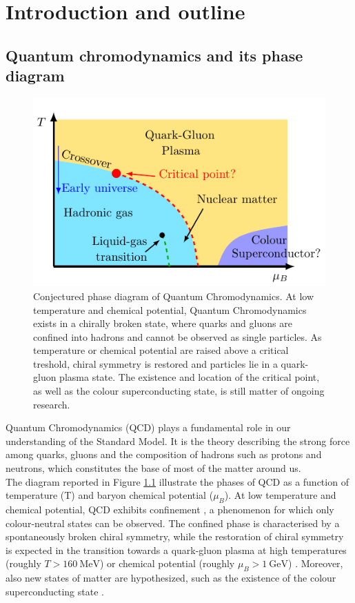 \chapter{Introduction and outline}
\label{chap:introduction}
\section{Quantum chromodynamics and its phase diagram}
\begin{figure}[h]
    \centering 
    \includegraphics[scale=1.3]{figures/phase_diagram.pdf}
    \caption[The phase diagram of QCD]{Conjectured phase diagram of Quantum Chromodynamics. At low temperature and chemical potential, Quantum Chromodynamics exists in a chirally broken state, where quarks and gluons are confined into hadrons and cannot be observed as single particles. As temperature or chemical potential are raised above a critical treshold, chiral symmetry is restored and particles lie in a quark-gluon plasma state. The existence and location of the critical point, as well as the colour superconducting state, is still matter of ongoing research.}
    \label{fig:QCD_phase_diagram}
\end{figure}
\noindent Quantum Chromodynamics (QCD) plays a fundamental role in our understanding of the Standard Model. It is the theory describing the strong force among quarks, gluons and the composition of hadrons such as protons and neutrons, which constitutes the base of most of the matter around us. \\
The diagram reported in Figure \ref{fig:QCD_phase_diagram} illustrate the phases of QCD as a function of temperature (T) and baryon chemical potential ($\mu_B$).
At low temperature and chemical potential, QCD exhibits confinement \cite{confinement_wilson,confin}, a phenomenon for which only colour-neutral states can be observed. The confined phase is characterised by a spontaneously broken chiral symmetry, while the restoration of chiral symmetry is expected in the transition towards a quark-gluon plasma at high temperatures (roughly $T > 160~\text{MeV}$) or chemical potential (roughly $\mu_B > 1~\text{GeV}$) \cite{Masayuki1989,Stephanov_1998,Berges_1999,doi:10.1142/S0217751X92001757,Endroedi_2014}. Moreover, also new states of matter are hypothesized, such as the existence of the colour superconducting state \cite{colorsuper1,colorsuper2,colorsuper3}. \\
